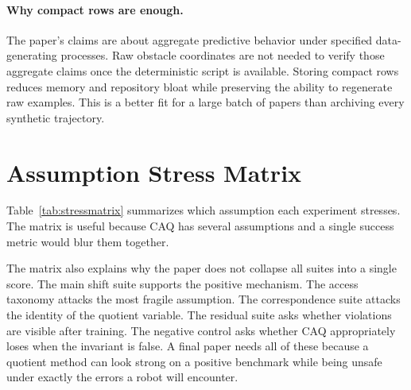 \documentclass{article}
\begin{document}
\paragraph{Why compact rows are enough.}
The paper's claims are about aggregate predictive behavior under specified data-generating processes. Raw obstacle coordinates are not needed to verify those aggregate claims once the deterministic script is available. Storing compact rows reduces memory and repository bloat while preserving the ability to regenerate raw examples. This is a better fit for a large batch of papers than archiving every synthetic trajectory.

\section{Assumption Stress Matrix}

Table~\ref{tab:stressmatrix} summarizes which assumption each experiment stresses. The matrix is useful because CAQ has several assumptions and a single success metric would blur them together.

\begin{table}[h]
\centering
\caption{Assumption stress matrix. A check means the suite primarily tests that assumption or its violation.}
\label{tab:stressmatrix}
\end{table}

The matrix also explains why the paper does not collapse all suites into a single score. The main shift suite supports the positive mechanism. The access taxonomy attacks the most fragile assumption. The correspondence suite attacks the identity of the quotient variable. The residual suite asks whether violations are visible after training. The negative control asks whether CAQ appropriately loses when the invariant is false. A final paper needs all of these because a quotient method can look strong on a positive benchmark while being unsafe under exactly the errors a robot will encounter.
\end{document}
